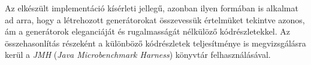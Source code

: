Az elkészült implementáció kísérleti jellegű, azonban ilyen formában is alkalmat ad arra, hogy a létrehozott generátorokat összevessük értelmüket tekintve azonos, ám a generátorok eleganciáját és rugalmasságát nélkülöző kódrészletekkel. Az összehasonlítás részeként a különböző kódrészletek teljesítménye is megvizsgálásra kerül a \textit{JMH} (\textit{Java Microbenchmark Harness}) könyvtár felhasználásával.